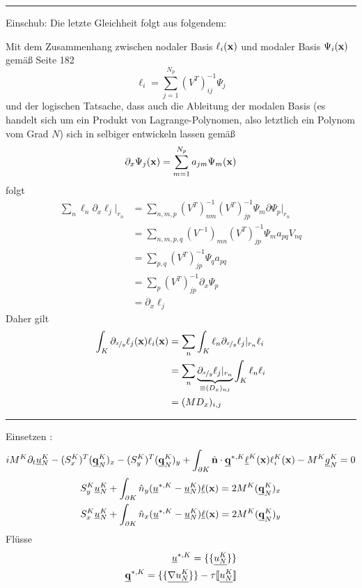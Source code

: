 \rule{\textwidth}{0.4pt}
 Einschub: Die letzte Gleichheit folgt aus folgendem:

 Mit dem Zusammenhang zwischen nodaler Basis $\ell_i(\vb{x})$ und modaler Basis $\Psi_i(\vb{x})$ gemäß Seite 182
 \begin{equation}
   \ell_i = \sum_{j=1}^{N_p} (V^{T})^{-1}_{ij} \Psi_j
 \end{equation}
 und der logischen Tatsache, dass auch die Ableitung der modalen Basis (es handelt sich um ein Produkt von Lagrange-Polynomen, also letztlich ein Polynom vom Grad $N$) sich in selbiger entwickeln lassen gemäß
 \begin{equation}
   \partial_x \Psi_j(\vb{x}) = \sum_{m=1}^{N_p} a_{jm}\Psi_m(\vb{x})
 \end{equation}
 folgt
 \begin{align*}
   \sum_n \ell_n \partial_x \ell_j |_{r_n} &= \sum_{n,m,p} (V^{T})^{-1}_{nm} (V^{T})^{-1}_{jp}\Psi_m\partial \Psi_p |_{r_n} \\
    &= \sum_{n,m,p,q} (V^{-1})_{mn}(V^{T})^{-1}_{jp} \Psi_m a_{pq} V_{nq}\\
    &= \sum_{p,q}(V^{T})^{-1}_{jp}\Psi_q a_{pq} \\
    &= \sum_p (V^{T})^{-1}_{jp} \partial_x \Psi_p\\
    &= \partial_x \ell_j
 \end{align*}
 Daher gilt
 \begin{align}
   \int_K \partial_{\nicefrac{x}{y}} \ell_j(\vb{x})\ell_i(\vb{x}) &= \sum_n \int_K   \ell_n \partial_{\nicefrac{x}{y}} \ell_j |_{r_n} \ell_i \\
   &= \sum_n \underbrace{\partial_{\nicefrac{x}{y}} \ell_j |_{r_n}}_{\equiv (D_x)_{nj}} \int_K \ell_n \ell_i \\
   &= (M D_x)_{i,j}
 \end{align}
\rule{\textwidth}{0.4pt}

Einsetzen :
\begin{align}
  iM^K\partial_t \underline{u}_N^K - (S^K_x)^T (\underline{\vb{q}}_N^K)_x - (S^K_y)^T (\underline{\vb{q}}_N^K)_y
  + \int_{\partial K}  \hat{\vb{n}} \cdot \underline{\vb{q}}^{*,K} \underline{\ell}^K(\vb{x}) \ell_i^K(\vb{x})
  - M^K\underline{g}_N^K = 0
\end{align}
\begin{align}
  S_y^K \underline{u}^K_N + \int_{\partial K} \hat{n}_{y}  (\underline{u}^{*,K} - \underline{u}_N^K)\underline{\ell}(\vb{x})
  = 2 M^K (\underline{\vb{q}}_N^K)_x \\
  S_x^K \underline{u}^K_N + \int_{\partial K} \hat{n}_{x}  (\underline{u}^{*,K} - \underline{u}_N^K)\underline{\ell}(\vb{x})
  = 2 M^K (\underline{\vb{q}}_N^K)_y \\
\end{align}
Flüsse
\begin{align}
  \underline{u}^{*,K} = \{\{ \underline{u_N^K} \}\}\\
  \underline{\vb{q}}^{*,K} = \{\{ \underline{\nabla u_N^K} \}\} - \tau\llbracket \underline{u_N^K} \rrbracket
\end{align}
